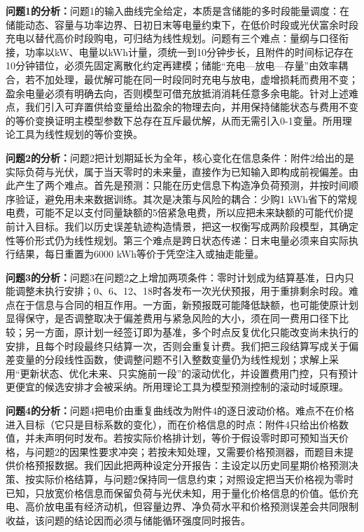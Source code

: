 \documentclass[UTF8,fontset=none,a4paper,zihao=-4]{ctexart}
\begin{document}
\textbf{问题1的分析：}问题1的输入曲线完全给定，本质是含储能的多时段能量调度：在储能动态、容量与功率边界、日初日末等电量约束下，在低价时段或光伏富余时段充电以替代高价时段购电，可归结为线性规划。问题有三个难点：量纲与口径衔接，功率以kW、电量以kWh计量，须统一到10分钟步长，且附件的时间标记存在10分钟错位，必须先固定离散化约定再建模；储能“充电—放电—存量”由效率耦合，若不加处理，最优解可能在同一时段同时充电与放电，虚增损耗而费用不变；盈余电量必须有明确去向，否则模型可借充放抵消消耗任意多余电能。针对上述难点，我们引入可弃置供给变量给出盈余的物理去向，并用保持储能状态与费用不变的等价变换证明主模型参数下总存在互斥最优解，从而无需引入0-1变量。所用理论工具为线性规划的等价变换。

\textbf{问题2的分析：}问题2把计划期延长为全年，核心变化在信息条件：附件2给出的是实际负荷与光伏，属于当天零时的未来量，直接作为已知输入即构成前视偏差。由此产生了两个难点。首先是预测：只能在历史信息下构造净负荷预测，并按时间顺序验证，避免用未来数据训练。其次是决策与风险的耦合：少购1 kWh省下的常规电费，可能不足以支付同量缺额的5倍紧急电费，所以应把未来缺额的可能代价提前计入目标。我们以历史误差轨迹构造情景，把这一权衡写成两阶段模型，其确定性等价形式仍为线性规划。第三个难点是跨日状态传递：日末电量必须来自实际执行结果，每日重置为6000 kWh等价于凭空注入或抽走能量。

\textbf{问题3的分析：}问题3在问题2之上增加两项条件：零时计划成为结算基准，日内只能调整未执行安排；0、6、12、18时各发布一次光伏预报，用于重排剩余时段。难点在于信息与合同的相互作用。一方面，新预报既可能降低缺额，也可能使原计划显得保守，是否调整取决于偏差费用与紧急风险的大小，须在同一费用口径下比较；另一方面，原计划一经签订即为基准，多个时点反复优化只能改变尚未执行的安排，且每个时段最终只结算一次，否则会重复计费。我们把三段结算写成关于偏差变量的分段线性函数，使调整问题不引入整数变量仍为线性规划；求解上采用“更新状态、优化未来、只实施前一段”的滚动优化，并设置费用门控，只有预计更便宜的候选安排才会被采纳。所用理论工具为模型预测控制的滚动时域原理。

\textbf{问题4的分析：}问题4把电价由重复曲线改为附件4的逐日波动价格。难点不在价格进入目标（它只是目标系数的变化），而在价格信息的时点：附件4只给出价格数值，并未声明何时发布。若按实际价格排计划，等价于假设零时即可预知当天价格，与问题2的因果性要求冲突；若按未知处理，又需要价格预测器，而题目未提供价格预报数据。我们因此把两种设定分开报告：主设定以历史同星期价格预测决策、按实际价格结算，与问题2保持同一信息约束；对照设定把当天价格视为零时已知，只放宽价格信息而保留负荷与光伏未知，用于量化价格信息的价值。低价充电、高价放电虽有经济动机，但容量边界、净负荷水平和价格预测误差会共同限制收益，该问题的结论因而必须与储能循环强度同时报告。
\end{document}
